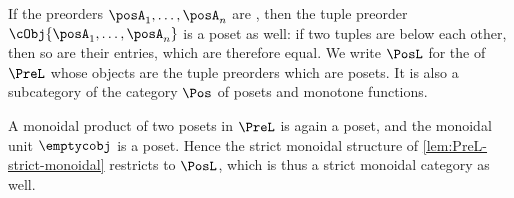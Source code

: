 \begin{remark}
    \label{def:PosL}
    If the preorders $\posA_1,\ldots, \posA_n$ are , then the tuple preorder $\cObj{\posA_1,\ldots, \posA_n}$ is a poset as well: if two tuples are below each other, then so are their entries, which are therefore equal.
    We write $\PosL$ for the  of $\PreL$ whose objects are the tuple preorders which are posets.
    It is also a subcategory of the category $\Pos$ of posets and monotone functions.

    A monoidal product of two posets in $\PreL$ is again a poset, and the monoidal unit $\emptycobj$ is a poset.
    Hence the strict monoidal structure of \cref{lem:PreL-strict-monoidal} restricts to $\PosL$, which is thus a strict monoidal category as well.
\end{remark}
%   

